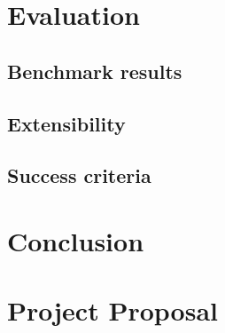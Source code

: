 \documentclass[12pt,a4paper,oneside,openright]{report}
\begin{document}

\chapter{Evaluation}

\section{Benchmark results}
\label{sec:eval:benchmark-results}

\section{Extensibility}
\label{sec:eval:extensibility}

\section{Success criteria}
\label{sec:eval:success-criteria}




\chapter{Conclusion}




\appendix

\chapter{Project Proposal}
\end{document}
